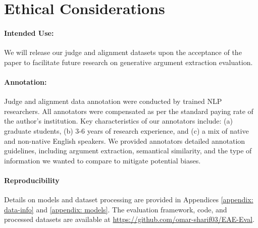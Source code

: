 \section*{Ethical Considerations}

\paragraph{Intended Use:} We will release our judge and alignment datasets upon the acceptance of the paper to facilitate future research on generative argument extraction evaluation.

\paragraph{Annotation:} Judge and alignment data annotation were conducted by trained NLP researchers. All annotators were compensated as per the standard paying rate of the author's institution. Key characteristics of our annotators include: (a) graduate students, (b) 3-6 years of research experience, and (c) a mix of native and non-native English speakers. We provided annotators detailed annotation guidelines, including argument extraction, semantical similarity, and the type of information we wanted to compare to mitigate potential biases. 

\paragraph{Reproducibility} Details on models and dataset processing are provided in Appendices \ref{appendix: data-info} and \ref{appendix: models}. The evaluation framework, code, and processed datasets are available at \href{https://github.com/omar-sharif03/EAE-Eval}{https://github.com/omar-sharif03/EAE-Eval}.

